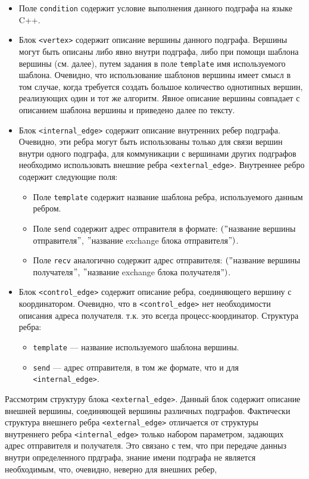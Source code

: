 \documentclass[a4paper, 12pt]{article}
\begin{document}
	\begin{itemize}
		\item Поле \lstinline$condition$ содержит условие выполнения данного подграфа на языке C++.
		\item Блок \lstinline$<vertex>$ содержит описание вершины данного подграфа. Вершины могут быть описаны либо явно внутри подграфа, либо при помощи шаблона вершины (см. далее), путем задания в поле \lstinline$template$ имя используемого шаблона. Очевидно, что использование шаблонов вершины имеет смысл в том случае, когда требуется создать большое количество однотипных вершин, реализующих один и тот же алгоритм. Явное описание вершины совпадает с описанием шаблона вершины и приведено далее по тексту. 
		\item Блок \lstinline$<internal_edge>$ содержит описание внутренних ребер подграфа. Очевидно, эти ребра могут быть использованы только для связи вершин внутри одного подграфа, для коммуникации с вершинами других подграфов необходимо использовать внешние ребра \lstinline$<external_edge>$. Внутреннее ребро содержит следующие поля:
		\begin{itemize}
			\item Поле \lstinline$template$ содержит название шаблона ребра, используемого данным ребром.
			\item Поле \lstinline$send$ содержит адрес отправителя в формате: $("$название вершины отправителя$"$, $"$название exchange блока отправителя$")$.
			\item Поле \lstinline$recv$ аналогично содержит адрес отправителя: $("$название вершины получателя$"$, $"$название exchange блока получателя$")$.
		\end{itemize}
		\item Блок \lstinline$<control_edge>$ содержит описание ребра, соединяющего вершину с координатором. Очевидно, что в \lstinline$<control_edge>$ нет необходимости описания адреса получателя. т.к. это всегда процесс-координатор. Структура ребра:
		\begin{itemize}
			\item \lstinline$template$ --- название используемого шаблона вершины.
			\item \lstinline$send$ --- адрес отправителя, в том же формате, что и для \lstinline$<internal_edge>$.
		\end{itemize}
	\end{itemize}
	Рассмотрим структуру блока \lstinline$<external_edge>$. Данный блок содержит описание внешней вершины, соединяющей вершины различных подграфов. Фактически структура внешнего ребра \lstinline$<external_edge>$ отличается от структуры внутреннего ребра \lstinline$<internal_edge>$ только набором параметром, задающих адрес отправителя и получателя. Это связано с тем, что при передаче данныз внутри определенного прдграфа, знание имени подграфа не является необходимым, что, очевидно, неверно для внешних ребер,
\end{document}
